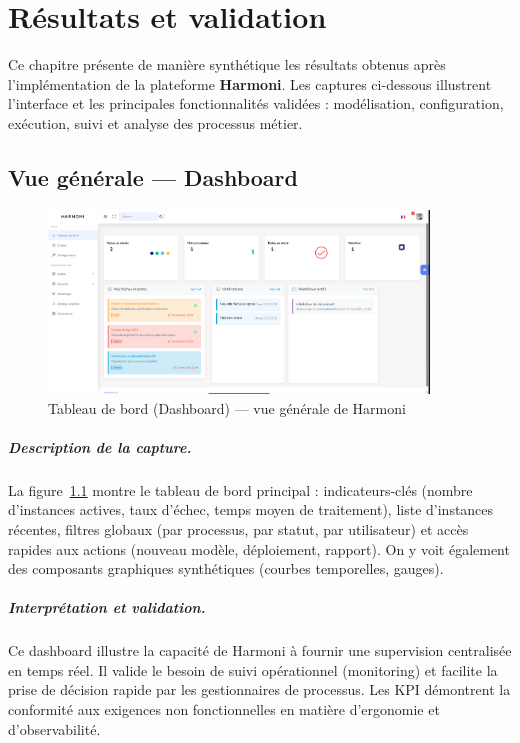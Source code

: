\chapter{Résultats et validation}
\label{ch:resultats}

Ce chapitre présente de manière synthétique les résultats obtenus après l’implémentation de la plateforme \textbf{Harmoni}.  
Les captures ci-dessous illustrent l’interface et les principales fonctionnalités validées : modélisation, configuration, exécution, suivi et analyse des processus métier.

\section{Vue générale — Dashboard}

\begin{figure}[H]
    \centering
    \includegraphics[width=0.9\textwidth]{Images/dashboard.png}
    \caption{Tableau de bord (Dashboard) — vue générale de Harmoni}
    \label{fig:dashboard}
\end{figure}

\paragraph{Description de la capture.}  
La figure~\ref{fig:dashboard} montre le tableau de bord principal : indicateurs-clés (nombre d'instances actives, taux d'échec, temps moyen de traitement), liste d'instances récentes, filtres globaux (par processus, par statut, par utilisateur) et accès rapides aux actions (nouveau modèle, déploiement, rapport). On y voit également des composants graphiques synthétiques (courbes temporelles, gauges).

\paragraph{Interprétation et validation.}  
Ce dashboard illustre la capacité de Harmoni à fournir une supervision centralisée en temps réel. Il valide le besoin de suivi opérationnel (monitoring) et facilite la prise de décision rapide par les gestionnaires de processus. Les KPI démontrent la conformité aux exigences non fonctionnelles en matière d’ergonomie et d’observabilité.

